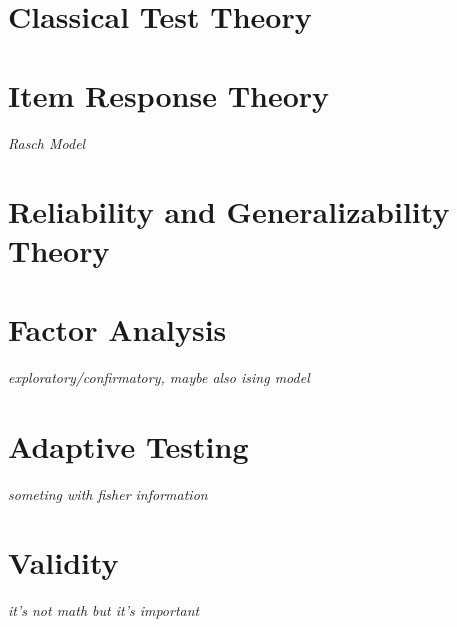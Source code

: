 \documentclass[../../../main.tex]{subfiles}
\begin{document}


\section{Classical Test Theory}

\section{Item Response Theory}
\textit{Rasch Model}

\section{Reliability and Generalizability Theory}

\section{Factor Analysis}
\textit{exploratory/confirmatory, maybe also ising model}

\section{Adaptive Testing}
\textit{someting with fisher information}

\section{Validity}
\textit{it's not math but it's important}

\printbibliography[
    heading=subbibintoc,
    title={References}
]
\end{document}
